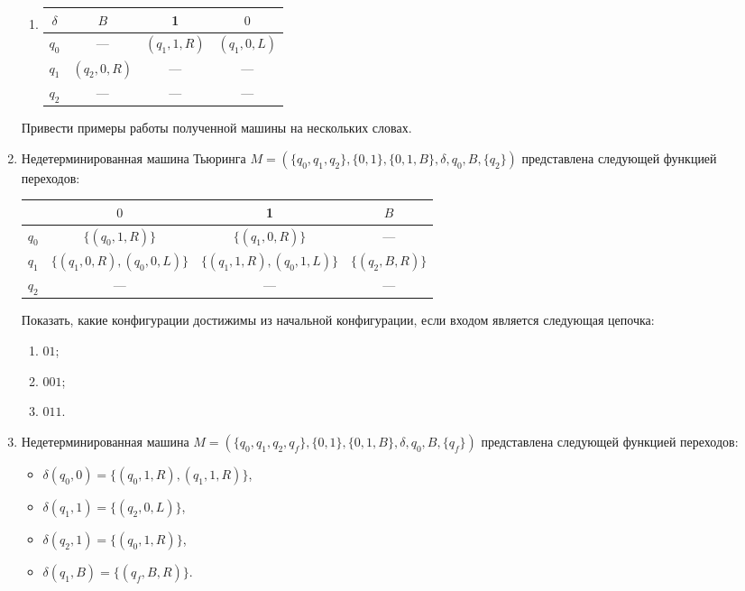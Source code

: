 \documentclass[12pt,a4paper]{article}
\begin{document}
\begin{enumerate}
\begin{multicols}{2}
\begin{enumerate}
\item 
  \begin{tabular}[t]{c||c|c|c}
     $\delta$ & $B$ & 1 & $0$\\
    \hline\hline
    $q_0$ & --- &$(q_1,1,R)$& $(q_1,0,L)$\\
    $q_1$ &$(q_2,0,R)$  & --- & --- \\
    $q_2$ & --- & --- & ---\\
  \end{tabular}
  \end{enumerate}
\end{multicols}

Привести примеры работы полученной машины на нескольких словах.

\item Недетерминированная машина Тьюринга $M=\left(\{q_0, q_1, q_2\},\{0,1\},\{0,1,B\},\delta,q_0,B,\{q_2\}\right)$  представлена следующей функцией переходов:
\begin{center}
  \begin{tabular}[t]{c||c|c|c}
     & $0$ & 1 & $B$\\
    \hline\hline
    $q_0$ & $\{(q_0, 1, R)\}$ &$\{(q_1,0,R)\}$ & --- \\
    $q_1$ &$\{(q_1, 0, R), (q_0,0,L)\}$  &$\{(q_1,1,R),(q_0,1,L)\}$& $\{(q_2,B,R)\}$\\
    $q_2$ & --- & --- & ---
  \end{tabular}
  
\end{center}
Показать, какие конфигурации достижимы из начальной конфигурации, 
если входом является следующая цепочка:
\begin{multicols}{3}
\begin{enumerate}
\item $01$;
\item $001$;
\item $011$.
\end{enumerate}
\end{multicols}

\item Недетерминированная машина $M=\left(\{q_0, q_1, q_2, q_f\},\{0,1\},\{0,1,B\},\delta,q_0,B,\{q_f\}\right)$  представлена следующей функцией переходов:
  \begin{multicols}{2}
  \begin{itemize}
  \item  $\delta(q_0,0)=\{(q_0,1,R), (q_1,1,R)\}$,
  \item $\delta(q_1,1)=\{(q_2,0,L)\}$,
  \item $\delta(q_2,1)=\{(q_0,1,R)\}$,
  \item $\delta(q_1,B)=\{(q_f, B, R)\}$.
  \end{itemize}
    

\end{multicols}
\end{enumerate}
\end{document}
